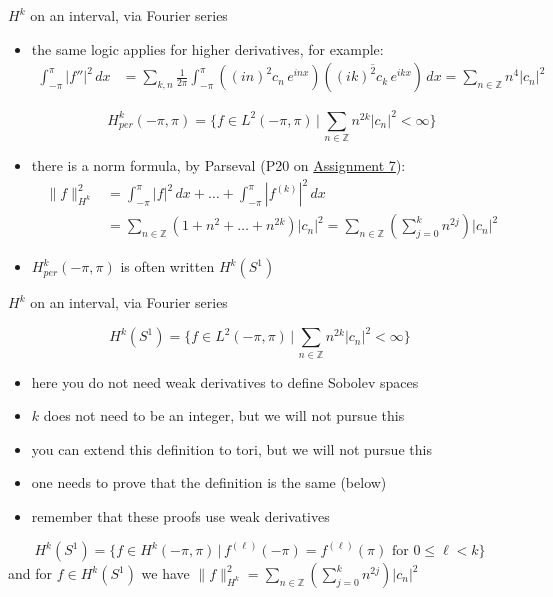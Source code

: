 \documentclass[10pt,
               svgnames,
               hyperref={colorlinks,
                         citecolor=DeepPink4,
                         linkcolor=FireBrick,
                         urlcolor=blue},
               usepdftitle=false]{beamer}
\newcommand{\ZZ}{\mathbb{Z}}
\newcommand{\ds}{\displaystyle}
\begin{document}
\begin{frame}{$H^k$ on an interval, via Fourier series}

\begin{itemize}
\item the same logic applies for higher derivatives, for example:
{\small
\begin{align*}
\int_{-\pi}^\pi |f''|^2\,dx &= \sum_{k,n} \frac{1}{2\pi} \int_{-\pi}^\pi ((i n)^2 c_n\, e^{inx})(\overline{(i k)^2 c_k\, e^{ikx}})\,dx = \sum_{n\in\ZZ} n^4 |c_n|^2
\end{align*}
}

\vspace{-2mm}
\begin{definition}
    $$H^k_{per}(-\pi,\pi) = \Big\{f\in L^2(-\pi,\pi) \,\Big|\, \sum_{n\in\ZZ} n^{2k} |c_n|^2 < \infty\Big\}$$
\end{definition}

\item there is a norm formula, by Parseval {\small (P20 on \href{https://bueler.github.io/fa/assets/homework/S26/A7.pdf}{Assignment 7})}:
{\small
\begin{align*}
\|f\|_{H^k}^2 &= \int_{-\pi}^\pi |f|^2\,dx + \dots + \int_{-\pi}^\pi |f^{(k)}|^2\,dx \\
&= \sum_{n\in\ZZ} (1+ n^2 + \dots + n^{2k}) |c_n|^2 = \sum_{n\in\ZZ} \left(\sum_{j=0}^k n^{2j}\right) |c_n|^2
\end{align*}
}
\item $H^k_{per}(-\pi,\pi)$ is often written $H^k(S^1)$
\end{itemize}
\end{frame}


\begin{frame}{$H^k$ on an interval, via Fourier series}

\begin{definition}
    $$H^k(S^1) = \Big\{f\in L^2(-\pi,\pi) \,\Big|\, \sum_{n\in\ZZ} n^{2k} |c_n|^2 < \infty\Big\}$$
\end{definition}

\begin{itemize}
\item here you do \alert{not} need weak derivatives to define Sobolev spaces
\item \alert{$k$ does not need to be an integer}, but we will not pursue this
\item \alert{you can extend this definition to tori}, but we will not pursue this
\item one needs to prove that the definition is the same (below)
\item remember that these proofs use weak derivatives
\end{itemize}

\begin{lemma}
   $$H^k(S^1) = \Big\{f \in H^k(-\pi,\pi)\, \Big|\, f^{(\ell)}(-\pi)=f^{(\ell)}(\pi) \text{ for } 0\le \ell < k \Big\}$$
and for $f\in H^k(S^1)$ we have $\ds \|f\|_{H^k}^2 = \sum_{n\in\ZZ} \left(\sum_{j=0}^k n^{2j}\right) |c_n|^2$
\end{lemma}
\end{frame}
\end{document}

